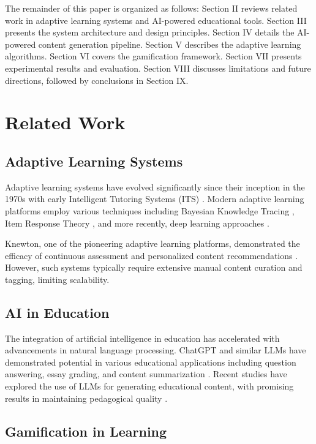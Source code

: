 \documentclass[conference]{IEEEtran}
\begin{document}
The remainder of this paper is organized as follows: Section II reviews related work in adaptive learning systems and AI-powered educational tools. Section III presents the system architecture and design principles. Section IV details the AI-powered content generation pipeline. Section V describes the adaptive learning algorithms. Section VI covers the gamification framework. Section VII presents experimental results and evaluation. Section VIII discusses limitations and future directions, followed by conclusions in Section IX.

\section{Related Work}

\subsection{Adaptive Learning Systems}

Adaptive learning systems have evolved significantly since their inception in the 1970s with early Intelligent Tutoring Systems (ITS) \cite{nwana1990intelligent}. Modern adaptive learning platforms employ various techniques including Bayesian Knowledge Tracing \cite{corbett1994knowledge}, Item Response Theory \cite{embretson2013item}, and more recently, deep learning approaches \cite{piech2015deep}.

Knewton, one of the pioneering adaptive learning platforms, demonstrated the efficacy of continuous assessment and personalized content recommendations \cite{thompson2013knewton}. However, such systems typically require extensive manual content curation and tagging, limiting scalability.

\subsection{AI in Education}

The integration of artificial intelligence in education has accelerated with advancements in natural language processing. ChatGPT and similar LLMs have demonstrated potential in various educational applications including question answering, essay grading, and content summarization \cite{kung2023performance}. Recent studies have explored the use of LLMs for generating educational content, with promising results in maintaining pedagogical quality \cite{elkins2023can}.

\subsection{Gamification in Learning}
\end{document}
